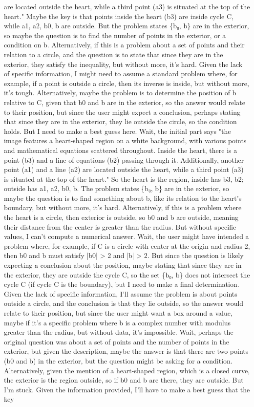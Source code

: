 are located outside the heart, while a third point (a3) is situated at the top of the heart." Maybe the key is that points inside the heart (b3) are inside cycle C, while a1, a2, b0, b are outside. But the problem states \{b₀, b\} are in the exterior, so maybe the question is to find the number of points in the exterior, or a condition on b. Alternatively, if this is a problem about a set of points and their relation to a circle, and the question is to state that since they are in the exterior, they satisfy the inequality, but without more, it's hard. Given the lack of specific information, I might need to assume a standard problem where, for example, if a point is outside a circle, then its inverse is inside, but without more, it's tough. Alternatively, maybe the problem is to determine the position of b relative to C, given that b0 and b are in the exterior, so the answer would relate to their position, but since the user might expect a conclusion, perhaps stating that since they are in the exterior, they lie outside the circle, so the condition holds. But I need to make a best guess here. Wait, the initial part says "the image features a heart-shaped region on a white background, with various points and mathematical equations scattered throughout. Inside the heart, there is a point (b3) and a line of equations (b2) passing through it. Additionally, another point (a1) and a line (a2) are located outside the heart, while a third point (a3) is situated at the top of the heart." So the heart is the region, inside has b3, b2; outside has a1, a2, b0, b. The problem states \{b₀, b\} are in the exterior, so maybe the question is to find something about b, like its relation to the heart's boundary, but without more, it's hard. Alternatively, if this is a problem where the heart is a circle, then exterior is outside, so b0 and b are outside, meaning their distance from the center is greater than the radius. But without specific values, I can't compute a numerical answer. Wait, the user might have intended a problem where, for example, if C is a circle with center at the origin and radius 2, then b0 and b must satisfy |b0| > 2 and |b| > 2. But since the question is likely expecting a conclusion about the position, maybe stating that since they are in the exterior, they are outside the cycle C, so the set \{b₀, b\} does not intersect the cycle C (if cycle C is the boundary), but I need to make a final determination. Given the lack of specific information, I'll assume the problem is about points outside a circle, and the conclusion is that they lie outside, so the answer would relate to their position, but since the user might want a box around a value, maybe if it's a specific problem where b is a complex number with modulus greater than the radius, but without data, it's impossible. Wait, perhaps the original question was about a set of points and the number of points in the exterior, but given the description, maybe the answer is that there are two points (b0 and b) in the exterior, but the question might be asking for a condition. Alternatively, given the mention of a heart-shaped region, which is a closed curve, the exterior is the region outside, so if b0 and b are there, they are outside. But I'm stuck. Given the information provided, I'll have to make a best guess that the key 